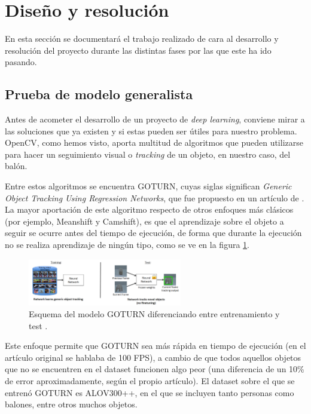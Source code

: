\section{Diseño y resolución}

En esta sección se documentará el trabajo realizado de cara al desarrollo y resolución del proyecto durante las distintas fases por las que este ha ido pasando.

\subsection{Prueba de modelo generalista}

Antes de acometer el desarrollo de un proyecto de \textit{deep learning}, conviene mirar a las soluciones que ya existen y si estas pueden ser útiles para nuestro problema. OpenCV, como hemos visto, aporta multitud de algoritmos que pueden utilizarse para hacer un seguimiento visual o \textit{tracking} de un objeto, en nuestro caso, del balón.

Entre estos algoritmos se encuentra GOTURN, cuyas siglas significan \textit{Generic Object Tracking Using Regression Networks}, que fue propuesto en un artículo de \citet{art:goturn}. La mayor aportación de este algoritmo respecto de otros enfoques más clásicos (por ejemplo, Meanshift y Camshift), es que el aprendizaje sobre el objeto a seguir se ocurre antes del tiempo de ejecución, de forma que durante la ejecución no se realiza aprendizaje de ningún tipo, como se ve en la figura \ref{fig:goturn1}.

\begin{figure}[H]
  \centering
  \includegraphics[width=0.6\textwidth]{images/goturn}
  \caption{Esquema del modelo GOTURN diferenciando entre entrenamiento y test \cite{art:goturn}.}
  \label{fig:goturn1}
\end{figure}

Este enfoque permite que GOTURN sea más rápida en tiempo de ejecución (en el artículo original se hablaba de 100 FPS), a cambio de que todos aquellos objetos que no se encuentren en el dataset funcionen algo peor (una diferencia de un 10\% de error aproximadamente, según el propio artículo). El dataset sobre el que se entrenó GOTURN es ALOV300++, en el que se incluyen tanto personas como balones, entre otros muchos objetos.


